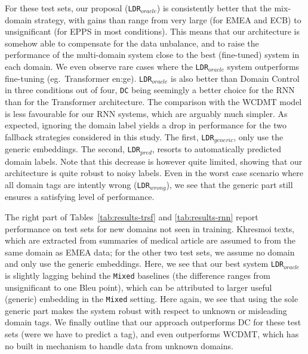 \documentclass[11pt,a4paper]{article}
\newcommand{\fyTodo}[1]{\Todo[FY:]{\textcolor{orange}{#1}}}
\begin{document}
For these test sets, our proposal (\texttt{LDR}$_{oracle}$) is consistently better that the mix-domain strategy, with gains than range from very large (for EMEA and ECB) to unsignificant (for EPPS in most conditions). This means that our architecture is somehow able to compensate for the data unbalance, and to raise the performance of the multi-domain system close to the best (fine-tuned) system in each domain. We even observe rare cases where the \texttt{LDR}$_{oracle}$ system outperforms fine-tuning (eg.\ Transformer en:ge). \texttt{LDR}$_{oracle}$ is also better than Domain Control in three conditions out of four, \texttt{DC} being seemingly a better choice for the RNN than for the Transformer architecture. The comparison with the WCDMT model is less favourable for our RNN systems, which are arguably much simpler.\fyTodo{More on this.}
As expected, ignoring the domain label yields a drop in performance for the two fallback strategies considered in this study. The first, \texttt{LDR}$_{generic}$, only use the generic embeddings. The second, \texttt{LDR}$_{pred}$\fyTodo{Fix this}, resorts to automatically predicted domain labels.\fyTodo{Explain how} Note that this decrease is however quite limited\fyTodo{How much on average ?}, showing that our architecture is quite robust to noisy labels. Even in the worst case scenario where all domain tags are intently wrong (\texttt{LDR}$_{wrong}$), we see that the generic part still ensures a satisfying level of performance.\fyTodo{Comment V2 from Minh}

The right part of Tables~\ref{tab:results-trsf} and \ref{tab:results-rnn} report performance on test sets for new domains not seen in training. Khresmoi texts, which are extracted from summaries of medical article are assumed to from the same domain as EMEA data; for the other two test sets, we assume no domain and only use the generic embeddings. Here, we see that our best system \texttt{LDR}$_{oracle}$ is slightly lagging behind the \texttt{Mixed} baselines (the difference ranges from unsignificant to one Bleu point), which can be attributed to larger useful (generic) embedding in the \texttt{Mixed} setting. Here again, we see that using the sole generic part makes the system robust with respect to unknown or misleading domain tags. We finally outline that our approach outperforms DC for these test sets (were we have to predict a tag)\fyTodo{Fix this}, and even outperforms WCDMT, which has no built in mechanism to handle data from unknown domains.
\end{document}
